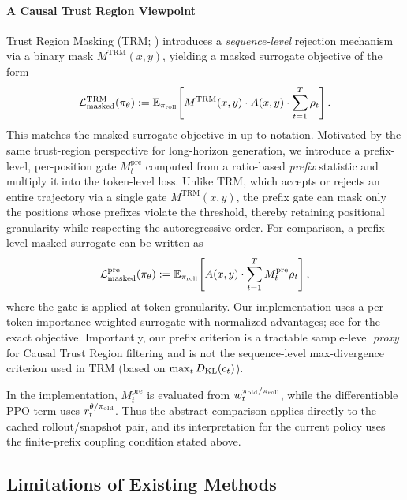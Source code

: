\paragraph{A Causal Trust Region Viewpoint}
Trust Region Masking (TRM; \citet{li2025trm}) introduces a \emph{sequence-level} rejection mechanism via a binary mask
$M^{\mathrm{TRM}}(x,y)$, yielding a masked surrogate objective of the form
\begin{equation*}
    \mathcal{L}_{\mathrm{masked}}^{\mathrm{TRM}}(\pi_{\theta})
    := \mathbb{E}_{\pi_{\mathrm{roll}}}\!\left[
        M^{\mathrm{TRM}}(x,y)\cdot A(x,y)\cdot \sum_{t=1}^{T}\rho_t
    \right].
\end{equation*}
This matches the masked surrogate objective in \citet{li2025trm} up to notation.
Motivated by the same trust-region perspective for long-horizon generation, we introduce a prefix-level, per-position gate
$M_t^{\mathrm{pre}}$ computed from a ratio-based \emph{prefix} statistic and multiply it into the token-level loss. Unlike TRM, which
accepts or rejects an entire trajectory via a single gate $M^{\mathrm{TRM}}(x,y)$, the prefix gate can mask only the positions whose prefixes violate the
threshold, thereby retaining positional granularity while respecting the autoregressive order. For comparison, a prefix-level masked
surrogate can be written as
\begin{equation*}
    \mathcal{L}_{\mathrm{masked}}^{\mathrm{pre}}(\pi_{\theta})
    := \mathbb{E}_{\pi_{\mathrm{roll}}}\!\left[
        A(x,y)\cdot \sum_{t=1}^{T} M_t^{\mathrm{pre}}\rho_t
    \right],
\end{equation*}
where the gate is applied at token granularity. Our implementation uses a per-token importance-weighted surrogate with normalized
advantages; see  for the exact objective. Importantly, our prefix criterion is a tractable sample-level
\emph{proxy} for Causal Trust Region filtering and is not the sequence-level max-divergence criterion used in TRM (based on
$\max_t D_{\mathrm{KL}}(c_t)$).

In the implementation, $M_t^{\mathrm{pre}}$ is evaluated from
$w_t^{\pi_{\mathrm{old}}/\pi_{\mathrm{roll}}}$, while the differentiable PPO term uses
$r_t^{\theta/\pi_{\mathrm{old}}}$. Thus the abstract comparison applies directly to the
cached rollout/snapshot pair, and its interpretation for the current policy
uses the finite-prefix coupling condition stated above.

\subsection{Limitations of Existing Methods}


